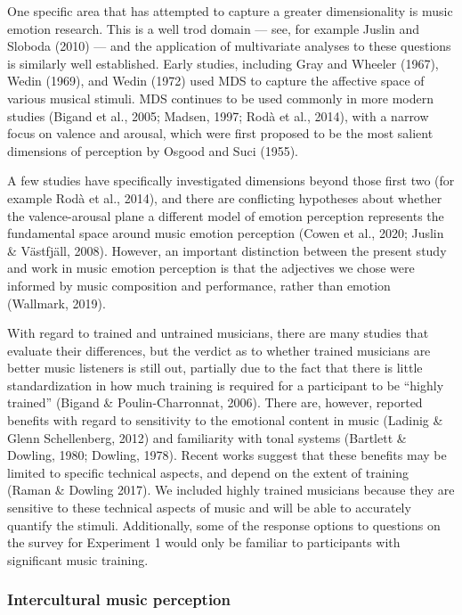 \documentclass[
  english,
  man,floatsintext]{apa6}
\begin{document}
One specific area that has attempted to capture a greater dimensionality is music emotion research. This is a well trod domain --- see, for example Juslin and Sloboda (2010) --- and the application of multivariate analyses to these questions is similarly well established. Early studies, including Gray and Wheeler (1967), Wedin (1969), and Wedin (1972) used MDS to capture the affective space of various musical stimuli. MDS continues to be used commonly in more modern studies (Bigand et al., 2005; Madsen, 1997; Rodà et al., 2014), with a narrow focus on valence and arousal, which were first proposed to be the most salient dimensions of perception by Osgood and Suci (1955).

A few studies have specifically investigated dimensions beyond those first two (for example Rodà et al., 2014), and there are conflicting hypotheses about whether the valence-arousal plane a different model of emotion perception represents the fundamental space around music emotion perception (Cowen et al., 2020; Juslin \& Västfjäll, 2008). However, an important distinction between the present study and work in music emotion perception is that the adjectives we chose were informed by music composition and performance, rather than emotion (Wallmark, 2019).

With regard to trained and untrained musicians, there are many studies that evaluate their differences, but the verdict as to whether trained musicians are better music listeners is still out, partially due to the fact that there is little standardization in how much training is required for a participant to be ``highly trained'' (Bigand \& Poulin-Charronnat, 2006). There are, however, reported benefits with regard to sensitivity to the emotional content in music (Ladinig \& Glenn Schellenberg, 2012) and familiarity with tonal systems (Bartlett \& Dowling, 1980; Dowling, 1978). Recent works suggest that these benefits may be limited to specific technical aspects, and depend on the extent of training (Raman \& Dowling 2017). We included highly trained musicians because they are sensitive to these technical aspects of music and will be able to accurately quantify the stimuli. Additionally, some of the response options to questions on the survey for Experiment 1 would only be familiar to participants with significant music training.

\hypertarget{intercultural-music-perception}{%
\subsubsection{Intercultural music perception}\label{intercultural-music-perception}}
\end{document}
